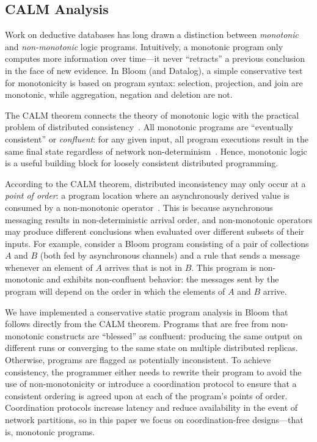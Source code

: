 \subsection{CALM Analysis}
\label{sec:bg-calm}

Work on deductive databases has long drawn a distinction between
\emph{monotonic} and \emph{non-monotonic} logic programs. Intuitively, a
monotonic program only computes more information over time---it never
``retracts'' a previous conclusion in the face of new evidence.  In Bloom
(and Datalog), a simple conservative test for monotonicity is based on program
syntax: selection, projection, and join are monotonic, while aggregation,
negation and deletion are not.

The CALM theorem connects the theory of monotonic logic with the practical
problem of distributed consistency~\cite{Alvaro2011,Hellerstein2010}.  All
monotonic programs are ``eventually consistent'' or \emph{confluent}: for any
given input, all program executions result in the same final state regardless of
network non-determinism~\cite{Ameloot2011,dedalus-confluence}.  Hence, monotonic
logic is a useful building block for loosely consistent distributed programming.

According to the CALM theorem, distributed inconsistency may only occur at a
\emph{point of order}: a program location where an asynchronously derived value
is consumed by a non-monotonic operator~\cite{Alvaro2011}.  This is because
asynchronous messaging results in non-deterministic arrival order, and
non-monotonic operators may produce different conclusions when evaluated over
different subsets of their inputs.  For example, consider a Bloom program
consisting of a pair of collections $A$ and $B$ (both fed by asynchronous
channels) and a rule that sends a message whenever an element of $A$ arrives
that is not in $B$.  This program is non-monotonic and exhibits non-confluent
behavior: the messages sent by the program will depend on the order in which the
elements of $A$ and $B$ arrive.

We have implemented a conservative static program analysis in Bloom that follows
directly from the CALM theorem.  Programs that are free from non-monotonic
constructs are ``blessed'' as confluent: producing the same output on different
runs or converging to the same state on multiple distributed replicas.
Otherwise, programs are flagged as potentially inconsistent.  To achieve
consistency, the programmer either needs to rewrite their program to avoid the
use of non-monotonicity or introduce a coordination protocol to ensure that a
consistent ordering is agreed upon at each of the program's points of order.
Coordination protocols increase latency and reduce availability in the event of
network partitions, so in this paper we focus on coordination-free
designs---that is, monotonic programs.

